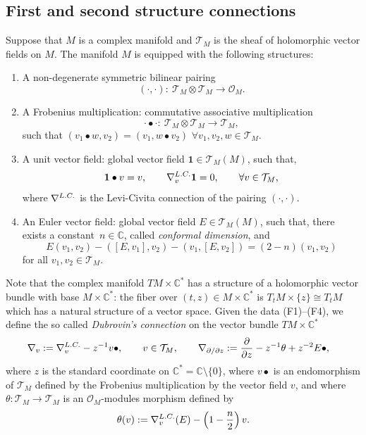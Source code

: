 \documentclass[10pt,a4paper]{article}
\numberwithin{equation}{section}
\newcommand{\CC}{\mathbb{C}}
\newcommand{\one}{\mathbf{1}}
\newcommand{\T}{\mathcal{T}}
\begin{document}
\subsection{First and second structure connections}
\label{sec:flat_connections}
Suppose that $M$ is a complex manifold and $\mathcal{T}_M$ is the
sheaf of holomorphic vector fields on $M$. The manifold $M$ is
equipped with the following structures:
\begin{enumerate}\itemsep=0pt
\item[(F1)]
 A non-degenerate symmetric bilinear pairing
 \[
 ( \cdot , \cdot )\colon\
 \mathcal{T}_M\otimes \mathcal{T}_M\to \mathcal{O}_M.
 \]
\item[(F2)]
 A Frobenius multiplication: commutative associative multiplication
 \begin{equation*}
 \cdot \bullet \cdot \colon\
 \mathcal{T}_M\otimes \mathcal{T}_M\to \mathcal{T}_M,
 \end{equation*}
 such that $(v_1\bullet w, v_2) = (v_1,w\bullet v_2)$ $\forall
 v_1,v_2,w\in \mathcal{T}_M$.
\item[(F3)]
 A unit vector field: global vector field $\one\in \mathcal{T}_M(M)$, such
 that,
 \begin{equation*}
 \one\bullet v =v,\qquad \nabla^{\rm L. C.}_v \one=0,\qquad \forall v\in \mathcal{T}_M,
 \end{equation*}
 where $\nabla^{\rm L. C.}$ is the Levi-Civita connection of the
 pairing $(\cdot,\cdot)$.
\item[(F4)]
 An Euler vector field: global vector field $E\in \mathcal{T}_M(M)$,
 such that, there exists a constant~${n\in \CC}$, called {\em conformal
 dimension}, and
 \begin{equation*}
 E(v_1,v_2)-([E,v_1],v_2)-(v_1,[E,v_2]) = (2-n) (v_1,v_2)
 \end{equation*}
 for all $v_1,v_2\in \T_M$.
\end{enumerate}
Note that the complex manifold $TM\times \CC^*$ has a structure of a
holomorphic vector bundle with base $M\times \CC^*$: the fiber over
$(t,z)\in M\times \CC^*$ is $T_tM\times \{z\}\cong T_tM$ which has a
natural structure of a vector space. Given the data (F1)--(F4), we
define the so called {\em Dubrovin's connection} on the vector bundle
$TM\times \mathbb{C}^*$
\begin{align*}
 &
 \nabla_v :=
 \nabla^{\rm L.C.}_v -z^{-1} v\bullet,\qquad v\in
 \mathcal{T}_M,
 \qquad
\nabla_{\partial/\partial z} := \frac{\partial}{\partial z} -
 z^{-1}\theta + z^{-2} E\bullet,
\end{align*}
where $z$ is the standard coordinate on
$\mathbb{C}^*=\mathbb{C}\setminus{\{0\}}$, where $v\bullet $ is an
endomorphism of $\mathcal{T}_M$ defined by the Frobenius
multiplication by the vector field $v$, and where $\theta\colon \mathcal{T}_M\to
\mathcal{T}_M$ is an $\mathcal{O}_M$-modules morphism defined by
\begin{equation*}
 \theta(v):=\nabla^{\rm L.C.}_v(E)-\left(1-\frac{n}{2}\right) v.
\end{equation*}
\end{document}
